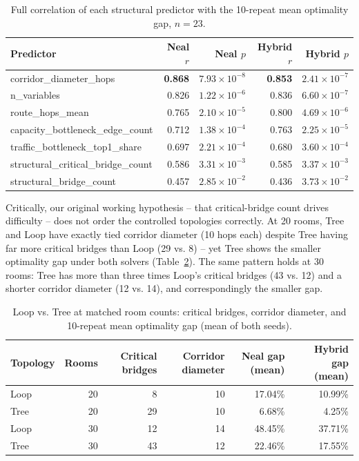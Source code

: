 \documentclass[11pt]{article}
\begin{document}
\begin{table}[h]
\centering
\caption{Full correlation of each structural predictor with the 10-repeat mean optimality gap, $n=23$.}
\label{tab:correlations}
\small
\begin{tabular}{lrrrr}
\toprule
Predictor & Neal $r$ & Neal $p$ & Hybrid $r$ & Hybrid $p$ \\
\midrule
corridor\_diameter\_hops & \textbf{0.868} & $7.93\times10^{-8}$ & \textbf{0.853} & $2.41\times10^{-7}$ \\
n\_variables & 0.826 & $1.22\times10^{-6}$ & 0.836 & $6.60\times10^{-7}$ \\
route\_hops\_mean & 0.765 & $2.10\times10^{-5}$ & 0.800 & $4.69\times10^{-6}$ \\
capacity\_bottleneck\_edge\_count & 0.712 & $1.38\times10^{-4}$ & 0.763 & $2.25\times10^{-5}$ \\
traffic\_bottleneck\_top1\_share & 0.697 & $2.21\times10^{-4}$ & 0.680 & $3.60\times10^{-4}$ \\
structural\_critical\_bridge\_count & 0.586 & $3.31\times10^{-3}$ & 0.585 & $3.37\times10^{-3}$ \\
structural\_bridge\_count & 0.457 & $2.85\times10^{-2}$ & 0.436 & $3.73\times10^{-2}$ \\
\bottomrule
\end{tabular}
\end{table}

Critically, our original working hypothesis -- that critical-bridge count drives difficulty -- does not order the controlled topologies correctly. At 20 rooms, Tree and Loop have exactly tied corridor diameter (10 hops each) despite Tree having far more critical bridges than Loop (29 vs. 8) -- yet Tree shows the smaller optimality gap under both solvers (Table~\ref{tab:synthetic}). The same pattern holds at 30 rooms: Tree has more than three times Loop's critical bridges (43 vs. 12) and a shorter corridor diameter (12 vs. 14), and correspondingly the smaller gap.

\begin{table}[h]
\centering
\caption{Loop vs. Tree at matched room counts: critical bridges, corridor diameter, and 10-repeat mean optimality gap (mean of both seeds).}
\label{tab:synthetic}
\small
\begin{tabular}{lrrrrr}
\toprule
Topology & Rooms & Critical bridges & Corridor diameter & Neal gap (mean) & Hybrid gap (mean) \\
\midrule
Loop & 20 & 8 & 10 & 17.04\% & 10.99\% \\
Tree & 20 & 29 & 10 & 6.68\% & 4.25\% \\
Loop & 30 & 12 & 14 & 48.45\% & 37.71\% \\
Tree & 30 & 43 & 12 & 22.46\% & 17.55\% \\
\bottomrule
\end{tabular}
\end{table}
\end{document}
